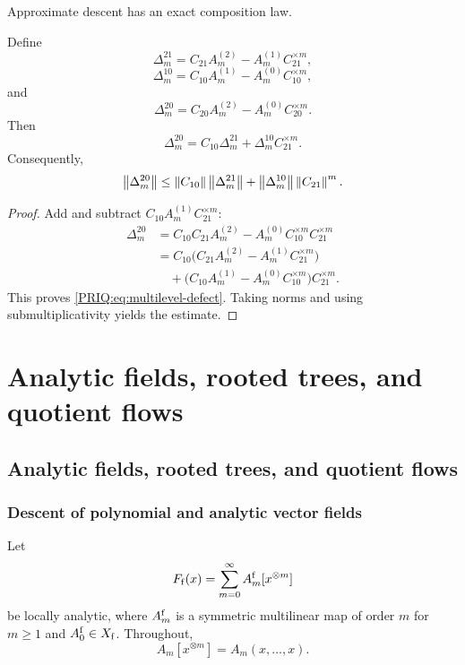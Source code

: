 Approximate descent has an exact composition law.

\begin{PRIQtheorem}\label{PRIQ:thm:multilevel-defect}
Define
\[
  \Delta_m^{21}
  =C_{21}A_m^{(2)}-A_m^{(1)}C_{21}^{\times m},
\]
\[
  \Delta_m^{10}
  =C_{10}A_m^{(1)}-A_m^{(0)}C_{10}^{\times m},
\]
and
\[
  \Delta_m^{20}
  =C_{20}A_m^{(2)}-A_m^{(0)}C_{20}^{\times m}.
\]
Then
\begin{equation}\label{PRIQ:eq:multilevel-defect}
  \boxed{
  \Delta_m^{20}
  =
  C_{10}\Delta_m^{21}
  +
  \Delta_m^{10}C_{21}^{\times m}.}
\end{equation}
Consequently,
\begin{equation}\label{PRIQ:eq:multilevel-defect-norm}
  \left\lVert \Delta_m^{20}\right\rVert
  \leq
  \left\lVert C_{10}\right\rVert\left\lVert \Delta_m^{21}\right\rVert
  +
  \left\lVert \Delta_m^{10}\right\rVert\left\lVert C_{21}\right\rVert^m.
\end{equation}
\end{PRIQtheorem}

\begin{proof}
Add and subtract $C_{10}A_m^{(1)}C_{21}^{\times m}$:
\begin{align*}
\Delta_m^{20}
&=C_{10}C_{21}A_m^{(2)}-A_m^{(0)}C_{10}^{\times m}C_{21}^{\times m}\\
&=C_{10}\bigl(C_{21}A_m^{(2)}-A_m^{(1)}C_{21}^{\times m}\bigr)\\
&\quad+
\bigl(C_{10}A_m^{(1)}-A_m^{(0)}C_{10}^{\times m}\bigr)C_{21}^{\times m}.
\end{align*}
This proves \eqref{PRIQ:eq:multilevel-defect}.  Taking norms and using submultiplicativity yields the estimate.
\end{proof}


\chapter{Analytic fields, rooted trees, and quotient flows}\label{PRIQ:book:chapter-40}
\section{Analytic fields, rooted trees, and quotient flows}\label{PRIQ:sec:analytic}

\subsection{Descent of polynomial and analytic vector fields}
Let
\begin{equation}\label{PRIQ:eq:fine-analytic-field}
  F_{\mathrm f}(x)
  =
  \sum_{m=0}^{\infty}A_m^{\mathrm f}[x^{\otimes m}]
\end{equation}
be locally analytic, where $A_m^{\mathrm f}$ is a symmetric multilinear map of order $m$ for $m\geq1$ and $A_0^{\mathrm f}\in X_{\mathrm f}$.  Throughout,
\[
  A_m[x^{\otimes m}]
  =A_m(x,\ldots,x).
\]

